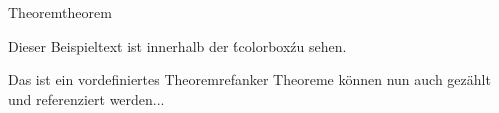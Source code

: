 \usepackage{xcolor}
\usepackage{tikz,pgf,verbatim,environ,etoolbox} %
\usepackage[most]{tcolorbox}

%
  {Theorem}{}{theorem}

\begin{tcolorbox}[colback=green!5!white,colframe=green!50!black,title=TColorBox Heading]
Dieser Beispieltext ist innerhalb der \'tcolorbox\' zu sehen.
\end{tcolorbox}

\begin{theo}{Das ist ein vordefiniertes Theorem}{refanker}
  Theoreme können nun auch gezählt und referenziert werden...
\end{theo}